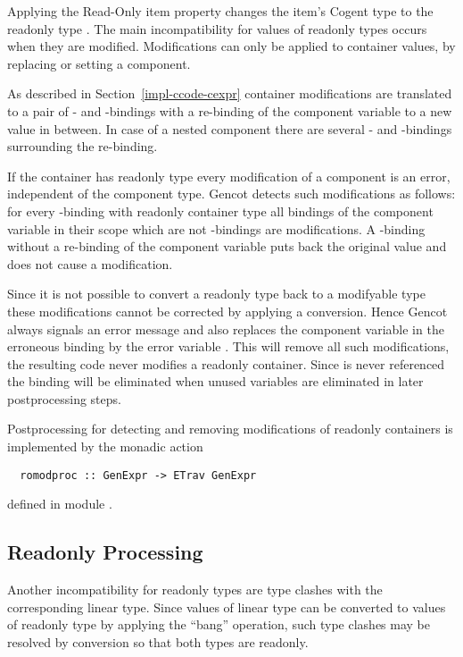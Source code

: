 Applying the Read-Only item property changes the item's Cogent type  to the readonly type . The main incompatibility
for values of readonly types occurs when they are modified. Modifications can only be applied to container values, by replacing
or setting a component.

As described in Section~\ref{impl-ccode-cexpr} container modifications are translated to a pair of - and -bindings
with a re-binding of the component variable to a new value in between. In case of a nested component there are several -
and -bindings surrounding the re-binding.

If the container has readonly type every modification of a component is an error, independent of the component type. Gencot detects
such modifications as follows: for every -binding with readonly container type all bindings of the component
variable in their scope which are not -bindings are modifications. A -binding without a re-binding of the
component variable puts back the original value and does not cause a modification.

Since it is not possible to convert a readonly type back to a modifyable type these modifications cannot be corrected by
applying a conversion. Hence Gencot always signals an error message and also replaces the component variable in the erroneous
binding by the error variable . This will remove all such modifications, the resulting code never modifies a
readonly container. Since  is never referenced the binding will be eliminated when unused variables are eliminated
in later postprocessing steps.

Postprocessing for detecting and removing modifications of readonly containers is implemented by the monadic action
\begin{verbatim}
  romodproc :: GenExpr -> ETrav GenExpr
\end{verbatim}
defined in module .

\subsection{Readonly Processing}
\label{impl-post-bang}

Another incompatibility for readonly types are type clashes with the corresponding linear type. Since values of linear type
can be converted to values of readonly type by applying the ``bang'' operation, such type clashes may be resolved by conversion
so that both types are readonly.

